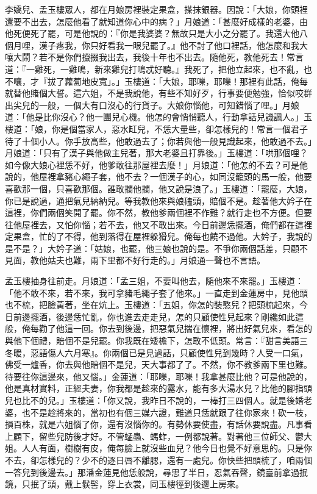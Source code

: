 李嬌兒、孟玉樓眾人，都在月娘房裡裝定果盒，搽抹銀器。因說：「大娘，你頭裡還要不出去，怎麼他看了就知道你心中的病？」月娘道：「甚麼好成樣的老婆，由他死便死了罷，可是他說的：『你是我婆婆？無故只是大小之分罷了。我還大他八個月哩，漢子疼我，你只好看我一眼兒罷了。』他不討了他口裡話，他怎麼和我大嚷大鬧？若不是你們攛掇我出去，我後十年也不出去。隨他死，教他死去！常言道：『一雞死，一雞鳴，新來雞兒打鳴忒好聽。』我死了，把他立起來，也不亂，也不嚷，才『拔了蘿蔔地皮寬」。」玉樓道：「大娘，耶嚛，耶嚛！那裡有此話，俺每就替他賭個大誓。這六姐，不是我說他，有些不知好歹，行事要便勉強，恰似咬群出尖兒的一般，一個大有口沒心的行貨子。大娘你惱他，可知錯惱了哩。」月娘道：「他是比你沒心？他一團兒心機。他怎的會悄悄聽人，行動拿話兒譏諷人。」玉樓道：「娘，你是個當家人，惡水缸兒，不恁大量些，卻怎樣兒的！常言一個君子待了十個小人。你手放高些，他敢過去了；你若與他一般見識起來，他敢過不去。」月娘道：「只有了漢子與他做主兒著，那大老婆且打靠後。」玉樓道：「哄那個哩？如今像大娘心裡恁不好，他爹敢往那屋裡去麼！」月娘道：「他怎的不去？可是他說的，他屋裡拿豬心繩子套，他不去？一個漢子的心，如同沒籠頭的馬一般，他要喜歡那一個，只喜歡那個。誰敢攔他攔，他又說是浪了。」玉樓道：「罷麼，大娘，你已是說過，通把氣兒納納兒。等我教他來與娘磕頭，賠個不是。趁著他大妗子在這裡，你們兩個笑開了罷。你不然，教他爹兩個裡不作難？就行走也不方便。但要往他屋裡去，又怕你惱；若不去，他又不敢出來。今日前邊恁擺酒，俺們都在這裡定果盒，忙的了不得，他到落得在屋裡躲猾兒。俺每也饒不過他。大妗子，我說的是不是？」大妗子道：「姑娘，也罷，他三娘也說的是。不爭你兩個話差，只顧不見面，教他姑夫也難，兩下里都不好行走的。」月娘通一聲也不言語。

孟玉樓抽身往前走。月娘道：「孟三姐，不要叫他去，隨他來不來罷。」玉樓道：「他不敢不來，若不來，我可拿豬毛繩子套了他來。」一直走到金蓮房中，見他頭也不梳，把臉黃著，坐在炕上。玉樓道：「五姐，你怎的裝憨兒？把頭梳起來，今日前邊擺酒，後邊恁忙亂，你也進去走走兒，怎的只顧使性兒起來？剛纔如此這般，俺每勸了他這一回。你去到後邊，把惡氣兒揣在懷裡，將出好氣兒來，看怎的與他下個禮，賠個不是兒罷。你我既在矮檐下，怎敢不低頭。常言：『甜言美語三冬暖，惡語傷人六月寒』。你兩個已是見過話，只顧使性兒到幾時？人受一口氣，佛受一爐香，你去與他賠個不是兒，天大事都了了。不然，你不教爹兩下里也難。待要往你這邊來，他又惱。」金蓮道：「耶嚛，耶嚛！我拿甚麼比他？可是他說的，他是真材實料，正經夫妻，你我都是趁來的露水，能有多大湯水兒？比他的腳指頭兒也比不的兒。」玉樓道：「你又說，我昨日不說的，一棒打三四個人。就是後婚老婆，也不是趁將來的，當初也有個三媒六證，難道只恁就跟了往你家來！砍一枝，損百株，就是六姐惱了你，還有沒惱你的。有勢休要使盡，有話休要說盡。凡事看上顧下，留些兒防後才好。不管蜢蟲、螞蚱，一例都說著。對著他三位師父、鬱大姐。人人有面，樹樹有皮，俺每臉上就沒些血兒？他今日也覺不好意思的。只是你不去，卻怎樣兒的？少不的逐日唇不離腮，還有一處兒。你快些把頭梳了，咱兩個一答兒到後邊去。」那潘金蓮見他恁般說，尋思了半日，忍氣吞聲，鏡臺前拿過抿鏡，只抿了頭，戴上䯼髻，穿上衣裳，同玉樓徑到後邊上房來。

